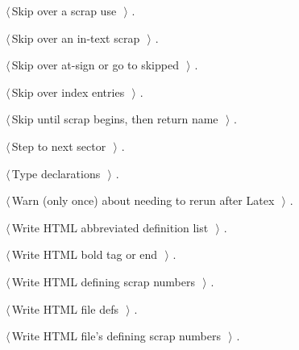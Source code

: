 \documentclass{report}
\begin{document}
{\begin{list}{}{\setlength{\itemsep}{-\parsep}\setlength{\itemindent}{-\leftmargin}}
{}
\item $\langle\,$Skip over a scrap use\nobreak\ {\footnotesize {}}$\,\rangle$ {\footnotesize {\NWtxtRefIn} .}
\item $\langle\,$Skip over an in-text scrap\nobreak\ {\footnotesize {}}$\,\rangle$ {\footnotesize {\NWtxtRefIn} .}
\item $\langle\,$Skip over at-sign or go to skipped\nobreak\ {\footnotesize {}}$\,\rangle$ {\footnotesize {\NWtxtRefIn} .}
\item $\langle\,$Skip over index entries\nobreak\ {\footnotesize {}}$\,\rangle$ {\footnotesize {\NWtxtRefIn} .
}
\item $\langle\,$Skip until scrap begins, then return name\nobreak\ {\footnotesize {}}$\,\rangle$ {\footnotesize {\NWtxtRefIn} .}
\item $\langle\,$Step to next sector\nobreak\ {\footnotesize {}}$\,\rangle$ {\footnotesize {\NWtxtRefIn} .
}
\item $\langle\,$Type declarations\nobreak\ {\footnotesize {}}$\,\rangle$ {\footnotesize {\NWtxtRefIn} .}
\item $\langle\,$Warn (only once) about needing to rerun after Latex\nobreak\ {\footnotesize {}}$\,\rangle$ {\footnotesize {\NWtxtRefIn} .
}
\item $\langle\,$Write HTML abbreviated definition list\nobreak\ {\footnotesize {}}$\,\rangle$ {\footnotesize {\NWtxtRefIn} .}
\item $\langle\,$Write HTML bold tag or end\nobreak\ {\footnotesize {}}$\,\rangle$ {\footnotesize {\NWtxtRefIn} .}
\item $\langle\,$Write HTML defining scrap numbers\nobreak\ {\footnotesize {}}$\,\rangle$ {\footnotesize {\NWtxtRefIn} .}
\item $\langle\,$Write HTML file defs\nobreak\ {\footnotesize {}}$\,\rangle$ {\footnotesize {\NWtxtRefIn} .}
\item $\langle\,$Write HTML file's defining scrap numbers\nobreak\ {\footnotesize {}}$\,\rangle$ {\footnotesize {\NWtxtRefIn} .}

\end{list}}
\end{document}
